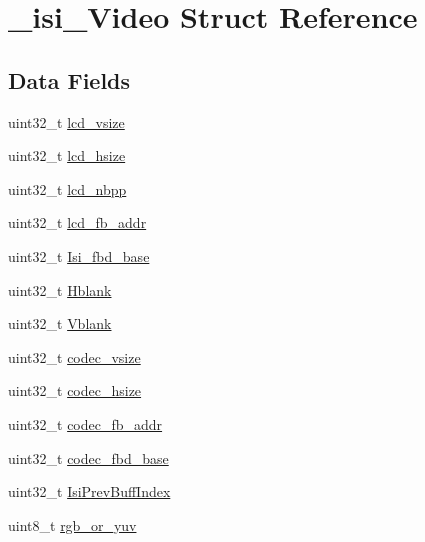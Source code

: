 \hypertarget{struct__isi__Video}{}\section{\+\_\+isi\+\_\+\+Video Struct Reference}
\label{struct__isi__Video}
\subsection*{Data Fields}
\begin{DoxyCompactItemize}
\item 
uint32\+\_\+t \mbox{\hyperlink{struct__isi__Video_a98ae06a9f22bd87bb661642bbab03cc6}{lcd\+\_\+vsize}}
\item 
uint32\+\_\+t \mbox{\hyperlink{struct__isi__Video_a08330e3651c236761e03945594c1ed3a}{lcd\+\_\+hsize}}
\item 
uint32\+\_\+t \mbox{\hyperlink{struct__isi__Video_ab9a6a44e8a044f701ac5dbd692d595a2}{lcd\+\_\+nbpp}}
\item 
uint32\+\_\+t \mbox{\hyperlink{struct__isi__Video_a11f287d8f29d904855f70261e0258aea}{lcd\+\_\+fb\+\_\+addr}}
\item 
uint32\+\_\+t \mbox{\hyperlink{struct__isi__Video_ae372500b244283864a31a14ecdec5025}{Isi\+\_\+fbd\+\_\+base}}
\item 
uint32\+\_\+t \mbox{\hyperlink{struct__isi__Video_a7e6c8e77e037f5c5436969d8bdcdc0ed}{Hblank}}
\item 
uint32\+\_\+t \mbox{\hyperlink{struct__isi__Video_a5076a63d3b0a19868542ff638c747c4e}{Vblank}}
\item 
uint32\+\_\+t \mbox{\hyperlink{struct__isi__Video_a37a501d100c225c9ba2c4e52c84abe41}{codec\+\_\+vsize}}
\item 
uint32\+\_\+t \mbox{\hyperlink{struct__isi__Video_a8f9abb1f4b3dc75cb0f5e110c716e392}{codec\+\_\+hsize}}
\item 
uint32\+\_\+t \mbox{\hyperlink{struct__isi__Video_a117876ecdfdccc8ef358bbd9c5e9a314}{codec\+\_\+fb\+\_\+addr}}
\item 
uint32\+\_\+t \mbox{\hyperlink{struct__isi__Video_a2ca13c79a26a817168463db37240843e}{codec\+\_\+fbd\+\_\+base}}
\item 
uint32\+\_\+t \mbox{\hyperlink{struct__isi__Video_a33019924119cd84e4a1972cafca173e8}{Isi\+Prev\+Buff\+Index}}
\item 
uint8\+\_\+t \mbox{\hyperlink{struct__isi__Video_ac6b940dc25ba87381788ccfa65b08ec8}{rgb\+\_\+or\+\_\+yuv}}
\end{DoxyCompactItemize}


